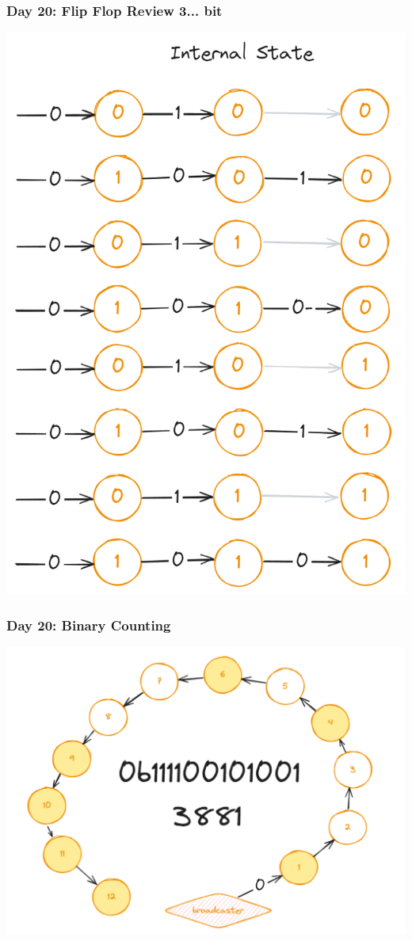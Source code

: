 \begin{frame}
\frametitle{Day 20: Flip Flop Review 3... bit}

\begin{center}
\includegraphics[height=\textheight]{Day20FlipFlop3Bit}
\end{center}

\end{frame}

\begin{frame}
\frametitle{Day 20: Binary Counting}

\begin{center}
\includegraphics[width=\textwidth]{Day20BinaryCounting}
\end{center}

\end{frame}